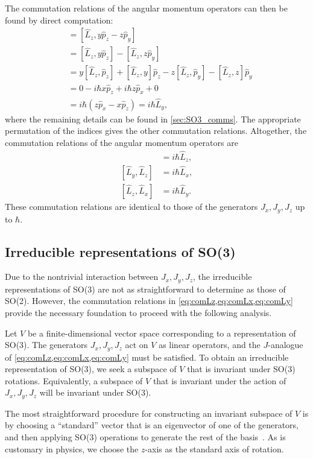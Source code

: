 The commutation relations of the angular momentum operators can then be found by direct computation:
\begin{align*}
    [\hat{L}_z,\hat{L}_x]
        &= [\hat{L}_z, y \hat{p}_z-z\hat{p}_y] \\
        &= [\hat{L}_z, y \hat{p}_z] - [\hat{L}_z, z\hat{p}_y] \\
        &= y[\hat{L}_z, \hat{p}_z] + [\hat{L}_z, y]\hat{p}_z - z[\hat{L}_z, \hat{p}_y] - [\hat{L}_z, z]\hat{p}_y \\
        &= 0 - i\hbar x\hat{p}_z + i\hbar z\hat{p}_x + 0 \\
        &= i\hbar(z\hat{p}_x - x\hat{p}_z) = i\hbar\hat{L}_y,
\end{align*}
where the remaining details can be found in \cref{sec:SO3_comms}. The appropriate permutation of the indices gives the other commutation relations. Altogether, the commutation relations of the angular momentum operators are
\begin{align}
    [\hat{L}_x,\hat{L}_y] &= i\hbar\hat{L}_z, \label{eq:comLz} \\
    [\hat{L}_y,\hat{L}_z] &= i\hbar\hat{L}_x, \label{eq:comLx} \\
    [\hat{L}_z,\hat{L}_x] &= i\hbar\hat{L}_y. \label{eq:comLy}
\end{align}
These commutation relations are identical to those of the generators $J_x,J_y,J_z$ up to $\hbar$.

\subsection{Irreducible representations of SO(3)}\label{sub:irr_SO3}
Due to the nontrivial interaction between $J_x,J_y,J_z$, the irreducible representations of SO(3) are not as straightforward to determine as those of SO(2). However, the commutation relations in \cref{eq:comLz,eq:comLx,eq:comLy} provide the necessary foundation to proceed with the following analysis.

Let $V$ be a finite-dimensional vector space corresponding to a representation of SO(3). The generators $J_x,J_y,J_z$ act on $V$ as linear operators, and the $J$-analogue of \cref{eq:comLz,eq:comLx,eq:comLy} must be satisfied. To obtain an irreducible representation of SO(3), we seek a subspace of $V$ that is invariant under SO(3) rotations. Equivalently, a subspace of $V$ that is invariant under the action of $J_x,J_y,J_z$ will be invariant under SO(3).

The most straightforward procedure for constructing an invariant subspace of $V$ is by choosing a ``standard'' vector that is an eigenvector of one of the generators, and then applying SO(3) operations to generate the rest of the basis~\cite{Tung1985}. As is customary in physics, we choose the $z$-axis as the standard axis of rotation.

